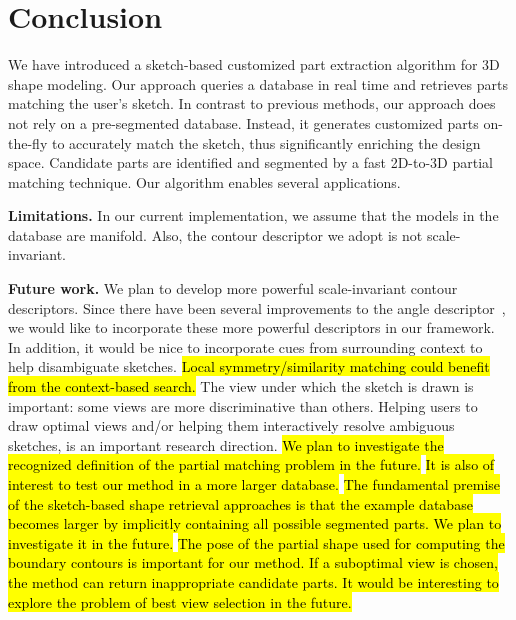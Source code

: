 

\section{Conclusion}
We have introduced a sketch-based customized part extraction algorithm for 3D shape modeling. Our approach queries a database in real time and retrieves parts matching the user's sketch. In contrast to previous methods, our approach does not rely on a pre-segmented database. Instead, it generates customized parts on-the-fly to accurately match the sketch, thus significantly enriching the design space. Candidate parts are identified and segmented by a fast 2D-to-3D partial matching technique. Our algorithm enables several applications.

\textbf{Limitations.}  In our current implementation, we assume that the models in the database are manifold. Also, the contour descriptor we adopt is not scale-invariant.

\textbf{Future work.} We plan to develop more powerful scale-invariant contour descriptors. Since there have been several improvements to the angle descriptor~\cite{frompartialshapematchingcvpr}, we would like to incorporate these more powerful descriptors in our framework. In addition, it would be nice to incorporate cues from surrounding context to help disambiguate sketches.
\hl{Local symmetry/similarity matching could benefit from the context-based search.}
The view under which the sketch is drawn is important: some views are more discriminative than others. Helping users to draw optimal views and/or helping them interactively resolve ambiguous sketches, is an important research direction.
\hl{We plan to investigate the recognized definition of the partial matching problem in the future. }
\hl{It is also of interest to test our method in a more larger database. }
\hl{The fundamental premise of the sketch-based shape retrieval approaches is that the example database becomes larger by implicitly containing all possible segmented parts. We plan to investigate it in the future. }
\hl{The pose of the partial shape used for computing the boundary contours is important for our method.
If a suboptimal view is chosen, the method can return inappropriate candidate parts.
It would be interesting to explore the problem of best view selection in the future. } 